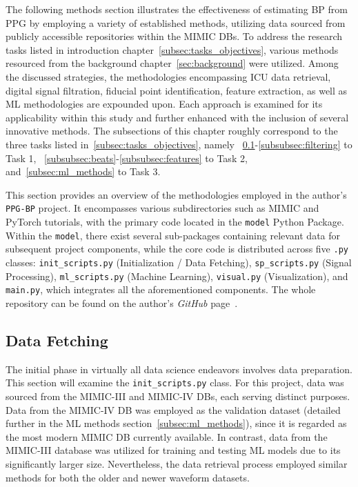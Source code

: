 The following methods section illustrates the effectiveness of estimating BP from PPG by employing a variety of established methods, utilizing data sourced from publicly accessible repositories within the MIMIC DBs.
To address the research tasks listed in introduction chapter~\ref{subsec:tasks_objectives}, various methods resourced from the background chapter~\ref{sec:background} were utilized.
Among the discussed strategies, the methodologies encompassing ICU data retrieval, digital signal filtration, fiducial point identification, feature extraction, as well as ML methodologies are expounded upon.
Each approach is examined for its applicability within this study and further enhanced with the inclusion of several innovative methods.
The subsections of this chapter roughly correspond to the three tasks listed in~\ref{subsec:tasks_objectives},
namely ~\ref{subsec:data-fetching}-\ref{subsubsec:filtering} to Task 1,
~\ref{subsubsec:beats}-\ref{subsubsec:features} to Task 2,
and~\ref{subsec:ml_methods} to Task 3.

This section provides an overview of the methodologies employed in the author's \texttt{PPG-BP} project.
It encompasses various subdirectories such as MIMIC and PyTorch tutorials, with the primary code located in the \texttt{model} Python Package.
Within the \texttt{model}, there exist several sub-packages containing relevant data for subsequent project components,
while the core code is distributed across five \texttt{.py} classes: \texttt{init\_scripts.py} (Initialization / Data Fetching), \texttt{sp\_scripts.py} (Signal Processing),
\texttt{ml\_scripts.py} (Machine Learning), \texttt{visual.py} (Visualization), and \texttt{main.py}, which integrates all the aforementioned components.
The whole repository can be found on the author's \textit{GitHub} page~\cite{jasinskasHtjasPPGBPProject2024}.

\subsection{Data Fetching}
\label{subsec:data-fetching}

The initial phase in virtually all data science endeavors involves data preparation.
This section will examine the \texttt{init\_scripts.py} class.
For this project, data was sourced from the MIMIC-III and MIMIC-IV DBs, each serving distinct purposes.
Data from the MIMIC-IV DB was employed as the validation dataset (detailed further in the ML methods section~\ref{subsec:ml_methods}), since it is regarded as the most modern MIMIC DB currently available.
In contrast, data from the MIMIC-III database was utilized for training and testing ML models due to its significantly larger size.
Nevertheless, the data retrieval process employed similar methods for both the older and newer waveform datasets.

